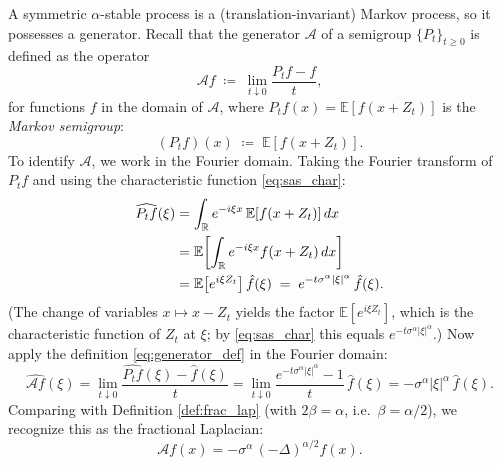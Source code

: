 \documentclass[11pt]{article}
\begin{document}
A symmetric $\alpha$-stable process is a (translation-invariant) Markov process, so it possesses a generator. Recall that the generator $\mathcal{A}$ of a semigroup $\{P_t\}_{t\ge 0}$ is defined as the operator
\begin{equation}\label{eq:generator_def}
\mathcal{A}f \;\coloneqq\; \lim_{t\downarrow 0}\frac{P_t f - f}{t},
\end{equation}
for functions $f$ in the domain of $\mathcal{A}$, where $P_t f(x) = {\mathbb E}[f(x + Z_t)]$ is the \emph{Markov semigroup}:
\begin{equation}\label{eq:stable_semigroup}
(P_t f)(x)\;\coloneqq\;{\mathbb E}\!\left[f(x+Z_t)\right].
\end{equation}
To identify $\mathcal{A}$, we work in the Fourier domain. Taking the Fourier transform of $P_t f$ and using the characteristic function \eqref{eq:sas_char}:
\begin{align}
\widehat{P_t f}(\xi)
&= \int_{\mathbb R} e^{-i\xi x}\,{\mathbb E}[f(x+Z_t)]\,dx \notag\\
&= {\mathbb E}\!\left[\int_{\mathbb R} e^{-i\xi x} f(x+Z_t)\,dx\right] \notag\\
&= {\mathbb E}\!\left[e^{i\xi Z_t}\right]\hat f(\xi)
\;=\;
e^{-t\sigma^\alpha|\xi|^\alpha}\,\hat f(\xi).
\label{eq:fourier_symbol}
\end{align}
(The change of variables $x \mapsto x - Z_t$ yields the factor ${\mathbb E}[e^{i\xi Z_t}]$, which is the characteristic function of $Z_t$ at $\xi$; by \eqref{eq:sas_char} this equals $e^{-t\sigma^\alpha|\xi|^\alpha}$.) Now apply the definition \eqref{eq:generator_def} in the Fourier domain:
\begin{equation}
\widehat{\mathcal{A}f}(\xi)
= \lim_{t\downarrow 0}\frac{\widehat{P_t f}(\xi)-\hat f(\xi)}{t}
= \lim_{t\downarrow 0}\frac{e^{-t\sigma^\alpha|\xi|^\alpha}-1}{t}\,\hat f(\xi)
= -\sigma^\alpha|\xi|^\alpha\,\hat f(\xi).
\label{eq:generator_symbol}
\end{equation}
Comparing with Definition \ref{def:frac_lap} (with $2\beta=\alpha$, i.e.\ $\beta=\alpha/2$), we recognize this as the fractional Laplacian:
\begin{equation}\label{eq:frac_lap}
\mathcal{A}f(x) = -\sigma^\alpha\,(-\Delta)^{\alpha/2} f(x).
\end{equation}
\end{document}
